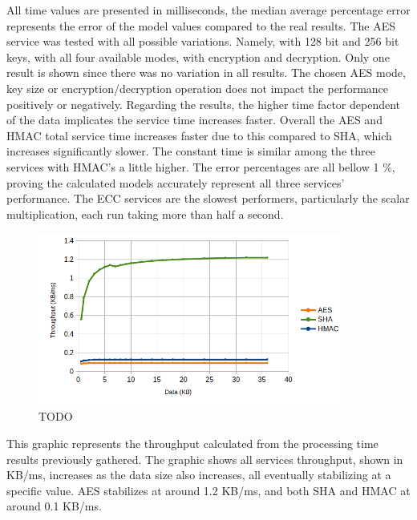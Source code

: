 

All time values are presented in milliseconds, the median average percentage error represents the error of the model values compared to the real results.
The \ac{AES} service was tested with all possible variations. Namely, with 128 bit and 256 bit keys, with all four available modes, with encryption and decryption. Only one result is shown since there was no variation in all results. The chosen \ac{AES} mode, key size or encryption/decryption operation does not impact the performance positively or negatively.
Regarding the results, the higher time factor dependent of the data implicates the service time increases faster. Overall the \ac{AES} and \ac{HMAC} total service time increases faster due to this compared to \ac{SHA}, which increases significantly slower. The constant time is similar among the three services with \ac{HMAC}'s a little higher.
The error percentages are all bellow 1 \%, proving the calculated models accurately represent all three services' performance.
The \ac{ECC} services are the slowest performers, particularly the scalar multiplication, each run taking more than half a second.

\begin{figure}[h!]
	\centering
	\includegraphics[width=0.9\textwidth]{./Images/core-tput.png}
	\caption{TODO}
	\label{fig:performance:core-tput}
\end{figure}

This graphic represents the throughput calculated from the processing time results previously gathered. The graphic shows all services throughput, shown in KB/ms, increases as the data size also increases, all eventually stabilizing at a specific value. \ac{AES} stabilizes at around 1.2 KB/ms, and both \ac{SHA} and \ac{HMAC} at around 0.1 KB/ms.

